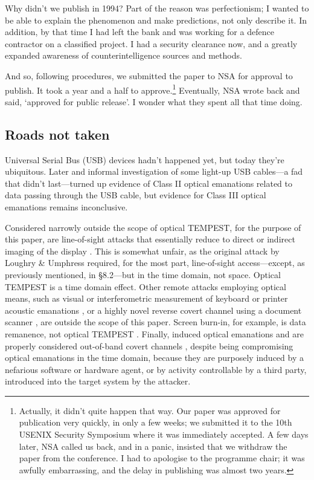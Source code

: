 \documentclass[conference]{IEEEtran}
\begin{document}
Why didn't we publish in 1994? Part of the reason was perfectionism; I wanted
to be able to explain the phenomenon and make predictions, not only describe
it. In addition, by that time I had left the bank and was working for a
defence contractor on a classified project. I had a security clearance now,
and a greatly expanded awareness of counterintelligence sources and methods.

And so, following procedures, we submitted the paper to NSA for approval to
publish. It took a year and a half to approve.\footnote{Actually, it didn't
quite happen that way. Our paper was approved for publication very quickly,
in only a few weeks; we submitted it to the 10th USENIX Security Symposium
where it was immediately accepted. A few days later, NSA called us back, and
in a panic, insisted that we withdraw the paper from the conference. I had to
apologise to the programme chair; it was awfully embarrassing, and the delay
in publishing was almost two years.} Eventually, NSA wrote back and said,
`approved for public release'. I wonder what they spent all that time doing.

\subsection{Roads not taken}

Universal Serial Bus (USB) devices hadn't happened yet, but today they're
ubiquitous. Later and informal investigation of some light-up USB cables---a
fad that didn't last---turned up evidence of Class II optical emanations
related to data passing through the USB cable, but evidence for Class III
optical emanations remains inconclusive.

Considered narrowly outside the scope of optical TEMPEST, for the purpose of
this paper, are line-of-sight attacks that essentially reduce to direct or
indirect imaging of the display
\cite{Backes2008,Balzarotti2008,Backes2009a,Raguram2011,Xu2013a,Jenkins2013a}.
This is somewhat unfair, as the original attack by Loughry \& Umphress
required, for the most part, line-of-sight access---except, as previously
mentioned, in \S 8.2---but in the time domain, not space. Optical TEMPEST is
a time domain effect. Other remote attacks employing optical means, such as
visual or interferometric measurement of keyboard or printer acoustic
emanations \cite{Asonov2004,Zhuang2005,Berger2006,Backes2010}, or a highly
novel reverse covert channel using a document scanner \cite{Nassi2017a}, are
outside the scope of this paper. Screen burn-in, for example, is data
remanence, not optical TEMPEST \cite{MDH1998a}. Finally, induced optical
emanations
\cite{Sepetnitsky2014a,Guri2016b,Guri2017a,Guri2017b,Lopes2017a,Guri2017c,
Zhou2017,Zhou2018a} and \cite[Appendix A]{Loughry2002a} are properly
considered out-of-band covert channels
\cite{Lampson1973,Hanspach2014,Carrara2016}, despite being compromising
optical emanations in the time domain, because they are purposely induced by
a nefarious software or hardware agent, or by activity controllable by a
third party, introduced into the target system by the attacker.
\end{document}
